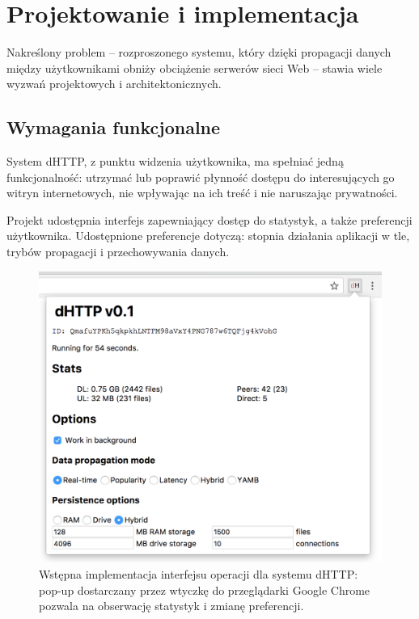 \chapter{Projektowanie i implementacja}
\label{cha:implementacja}

Nakreślony problem -- rozproszonego systemu, który dzięki propagacji danych między użytkownikami obniży obciążenie serwerów sieci Web -- stawia wiele wyzwań projektowych i architektonicznych.

\section{Wymagania funkcjonalne}
\label{sec:funkcjonalnosc}

System dHTTP, z punktu widzenia użytkownika, ma spełniać jedną funkcjonalność: utrzymać lub poprawić płynność dostępu do interesujących go witryn internetowych, nie wpływając na ich treść i nie naruszając prywatności.

Projekt udostępnia interfejs zapewniający dostęp do statystyk, a także preferencji użytkownika. Udostępnione preferencje dotyczą: stopnia działania aplikacji w tle, trybów propagacji i przechowywania danych.
\begin{figure}[h]
	\centering
    \includegraphics[scale=0.5]{dhttp-initial-interface.png}
	
	\caption{\label{fig:initialInterface} Wstępna implementacja interfejsu operacji dla systemu dHTTP: pop-up dostarczany przez wtyczkę do przeglądarki Google Chrome pozwala na obserwację statystyk i zmianę preferencji.}
\end{figure}

